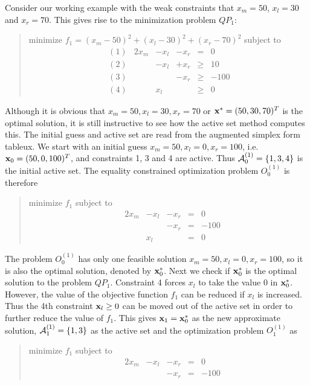 \documentclass{article}
\begin{document}
%
%

Consider our working example with the weak constraints that
$x_m=50$, $x_l=30$ and $x_r=70$\@. This gives rise to the
minimization problem $QP_1:$
\begin{quote}
minimize $f_1 = (x_m - 50)^2 + (x_l - 30)^2 
+ (x_r - 70)^2 $ subject to
$$
\begin{array}{rrrrcl}
(1)  & 2 x_m & -x_l & -x_r & = & 0 \\
(2)      &       & -x_l & +x_r & \geq & 10 \\
(3)      &       &      & -x_r & \geq & -100 \\
(4)      &       & x_l  &      & \geq & 0 
\end{array}
$$
\end{quote}
Although it is obvious that $x_m = 50, x_l = 30, x_r = 70 $
or $ {\bf x}^\ast = (50,30,70)^T$ is the optimal solution, it is still
instructive to see how the active set method computes this. 
The initial guess and active set are read from the augmented simplex form
tableux. We start with
an initial guess $x_m = 50, x_l = 0, x_r = 100$,
i.e.\ ${\bf x}_0=(50,0,100)^T$,
and constraints 1, 3 and 4 are active. Thus 
${\cal A}^{(1)}_0 = \{ 1,3,4 \}$ is the initial active set. The equality
constrained optimization problem $O^{(1)}_0$ is therefore
\begin{quote}
minimize $f_1$ subject to
$$
\begin{array}{rrrrrr}
          & 2x_m & -x_l & -x_r & = & 0 \\
	  &      &      & -x_r & = & -100 \\
	  &      & x_l  &      & = & 0
\end{array}
$$
\end{quote}
The problem $O^{(1)}_0$ has only one feasible solution $x_m = 50, x_l = 0,
x_r = 100$, so it is also the optimal solution, denoted by ${\bf x}^\ast_0$\@.
Next we check if ${\bf x}^\ast_0$ is the optimal solution to the problem
$QP_1$\@. Constraint 4 forces $x_l$ to take the value 0
in ${\bf x}^\ast_0$\@. However, the value of the
objective function $f_1$ can be reduced if $x_l$ 
is increased. 
Thus the 4th constraint ${\bf x}_l \geq 0 $ can be moved out of the active
set in order to further reduce the value of $f_1$\@. This gives
${\bf x}_1 = {\bf x}^\ast_0$ as the new approximate
solution, ${\cal A}^{(1)}_1 = \{1,3\}$ as the active set and the optimization
problem $O^{(1)}_1$ as 
\begin{quote}
minimize $f_1$ subject to
$$\begin{array}{rrrrrr} 
          & 2x_m & -x_l & -x_r & = & 0 \\
	  &      &      & -x_r & = & -100
\end{array}
$$
\end{quote}
\end{document}
